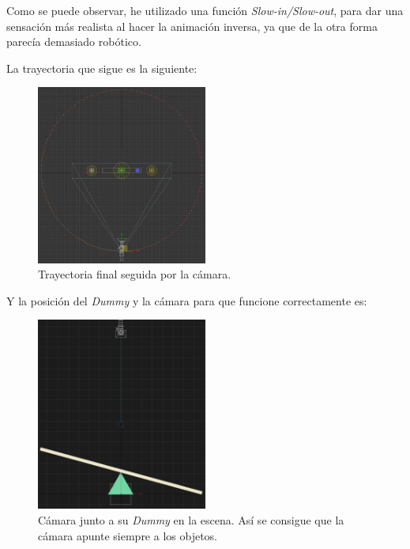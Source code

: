 Como se puede observar, he utilizado una función \textit{Slow-in/Slow-out}, para dar una sensación más realista al hacer la animación inversa, ya que de la otra forma parecía demasiado robótico.

\newpage

La trayectoria que sigue es la siguiente:

\begin{figure}[H]
   \centering
   \includegraphics[width=0.5\textwidth]{imagenes/misc/CameraPath.png}
   \caption{Trayectoria final seguida por la cámara.}
\end{figure}

\bigskip

Y la posición del \textit{Dummy} y la cámara para que funcione correctamente es:

\begin{figure}[H]
   \centering
   \includegraphics[width=0.5\textwidth]{imagenes/misc/DummyCamera.png}
   \caption{Cámara junto a su \textit{Dummy} en la escena. Así se consigue que la cámara apunte siempre a los objetos.}
\end{figure}

\newpage
